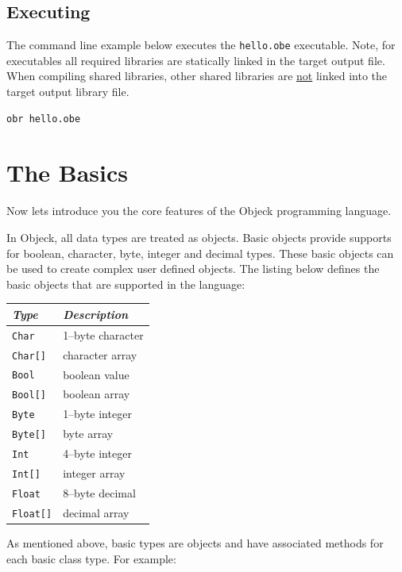 \documentclass[12pt]{article}
\begin{document}
\subsection{Executing}
The command line example below executes the \texttt{hello.obe} executable. Note, for executables all required libraries are statically linked in the target output file.  When compiling shared libraries, other shared libraries are \underline{not} linked into the target output library file.

\begin{verbatim}
obr hello.obe
\end{verbatim}

\section{The Basics}
Now lets introduce you the core features of the Objeck programming language.
\vspace{\baselineskip}

In Objeck, all data types are treated as objects. Basic objects provide supports for boolean, character, byte, integer and decimal types.  These basic objects can be used to create complex user defined objects.  The listing below defines the basic objects that are supported in the language:

\begin{center}
\begin{tabular}{| l | l |}
\hline
\emph{Type} & \emph{Description} \\ \hline \hline
\texttt{Char} &  1--byte character \\ \hline
\texttt{Char[]} &  character array \\ \hline
\texttt{Bool} &  boolean value \\ \hline
\texttt{Bool[]} &  boolean array \\ \hline
\texttt{Byte} &  1--byte integer \\ \hline
\texttt{Byte[]} &  byte array \\ \hline
\texttt{Int} &  4--byte integer \\ \hline
\texttt{Int[]} &  integer array \\ \hline
\texttt{Float} &  8--byte decimal \\ \hline
\texttt{Float[]} &  decimal array \\ \hline
\end{tabular}
\end{center}

As mentioned above, basic types are objects and have associated methods for each basic class type.  For example:
\end{document}
